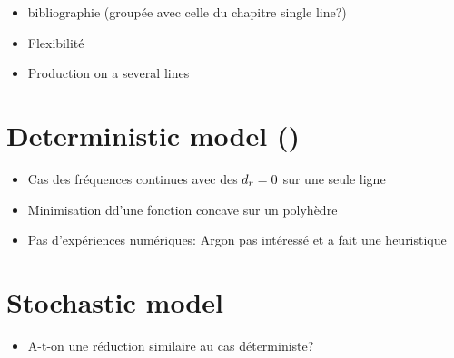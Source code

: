 \begin{itemize}
  \item bibliographie (groupée avec celle du chapitre single line?)
  \item Flexibilité
  \item Production on a several lines
\end{itemize}




\section{Deterministic model (\tbc)}

\begin{itemize}
  \item Cas des fréquences continues avec des $d_r=0$ sur une seule ligne
  \item Minimisation dd'une fonction concave sur un polyhèdre
  \item Pas d'expériences numériques: Argon pas intéressé et a fait une heuristique
\end{itemize}



\section{Stochastic model}


\begin{itemize}
  \item A-t-on une réduction similaire au cas déterministe? \tbc
\end{itemize}

